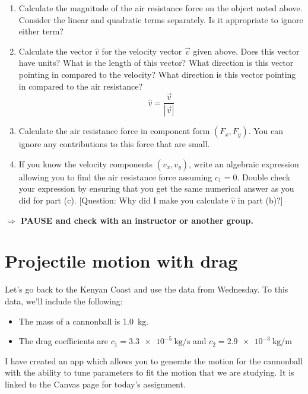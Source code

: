 \documentclass[12pt,hidelinks]{article}
\newcommand{\checkin}{{\bf \noindent $\Rightarrow$ PAUSE and check with an instructor or another
  group.}}
\begin{document}
\begin{enumerate}
  \item Calculate the magnitude of the air resistance force on the object noted above. Consider
  the linear and quadratic terms separately. Is it appropriate to ignore either term?
  \vspace{1in}
  \item Calculate the vector $\hat{v}$ for the velocity vector $\vec{v}$ given above. Does this
  vector have units? What is the length of this vector? What direction is this vector pointing
  in compared to the velocity? What direction is this vector pointing in compared to the air
  resistance?
  \[
    \hat{v} = \frac{\vec{v}}{\left|\vec{v}\right|}
  \]
  \vspace{0.5in}
  \item Calculate the air resistance force in component form $(F_x,F_y)$. You can ignore any
  contributions to this force that are small. \vspace{1.5in}
  \item If you know the velocity components $(v_x,v_y)$, write an algebraic expression allowing
  you to find the air resistance force assuming $c_1=0$. Double check your expression by
  ensuring that you get the same numerical answer as you did for part (c). [Question: Why did I
  make you calculate $\hat{v}$ in part (b)?] \vspace{1in}
\end{enumerate}

\checkin

\section{Projectile motion with drag}

Let's go back to the Kenyan Coast and use the data from Wednesday. To this data, we'll include
the following:
\begin{itemize}
  \item The mass of a cannonball is \SI{1.0}{\kilo\gram}.
  \item The drag coefficients are $c_1 = \SI{3.3e-5}{\kilo\gram\per\second}$ and $c_2
  = \SI{2.9e-3}{\kilo\gram\per\meter}$
\end{itemize}

I have created an app which allows you to generate the motion for the cannonball with the
ability to tune parameters to fit the motion that we are studying.  It is linked to the Canvas
page for today's assignment.
\end{document}
